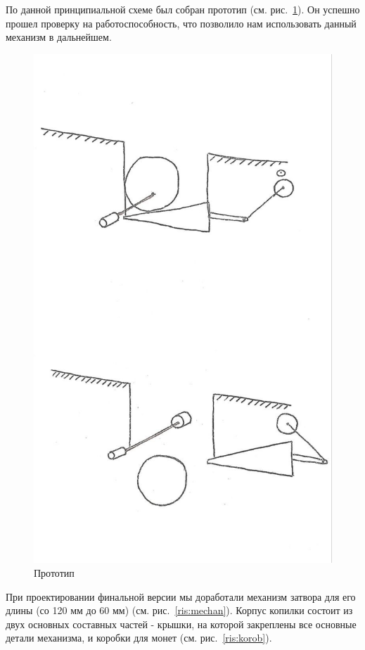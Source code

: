 По данной принципиальной схеме был собран прототип (см. рис.~\ref{ris:proto}). Он успешно прошел проверку на работоспособность, что позволило нам использовать данный механизм в дальнейшем.

\begin{figure}[H]
	\centering
	\includegraphics[width=12cm]{scheme_idea.jpg}
	\caption{Прототип}
	\label{ris:proto}
\end{figure}
\par\medskip

При проектировании финальной версии мы доработали механизм затвора для его длины (со 120 мм до 60 мм) (см. рис.~\ref{ris:mechan}).
Корпус копилки состоит из двух основных составных частей - крышки, на которой закреплены все основные детали механизма, и коробки для монет (см. рис.~\ref{ris:korob}). 

